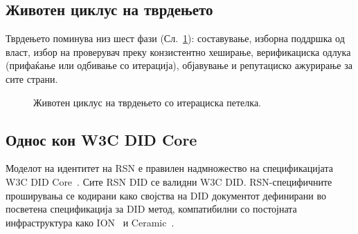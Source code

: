 \documentclass[11pt,a4paper,twocolumn]{article}
\begin{document}
\subsection{Животен циклус на тврдењето}

Тврдењето поминува низ шест фази (Сл.~\ref{fig:lifecycle}): составување, изборна поддршка од власт, избор на проверувач преку конзистентно хеширање, верификациска одлука (прифаќање или одбивање со итерација), објавување и репутациско ажурирање за сите страни.

\begin{figure}[ht]
\centering
{}
\caption{Животен циклус на тврдењето со итерациска петелка.}
\label{fig:lifecycle}
\end{figure}

\subsection{Однос кон W3C DID Core}

Моделот на идентитет на RSN е правилен надмножество на спецификацијата W3C DID Core~\cite{did2022}. Сите RSN DID се валидни W3C DID. RSN-специфичните проширувања се кодирани како својства на DID документот дефинирани во посветена спецификација за DID метод, компатибилни со постојната инфраструктура како ION~\cite{buchner2021} и Ceramic~\cite{ceramic2023}.

\end{document}
